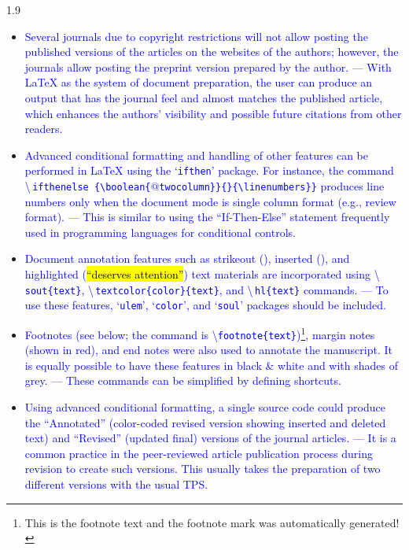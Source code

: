 \documentclass[phd]{ndsu-thesis-2022}
\newcommand\myspacing{1.9} %
\newcommand\italk[1]{\textcolor{blue}{#1}}  %
\newcommand\cmd[1]{\textbackslash\texttt{#1}}  %
\newcommand\lx{\LaTeX\xspace}
\newcommand\vb[1]{\textcolor{blue}{\texttt{#1}}}%
\newcommand\vbc[1]{\textcolor{blue}{\textbackslash\,\texttt{#1}}}%
\begin{document}
\begin{spacing}{\myspacing}
\begin{itemize}[leftmargin=*, itemsep=0pt, parsep=3pt]
\item \italk{Several journals due to copyright restrictions will not allow posting the published versions of the articles on the websites of the authors; however, the journals allow posting the preprint version prepared by the author. --- With \lx as the system of document preparation, the user can produce an output that has the journal feel and almost matches the published article, which enhances the authors' visibility and possible future citations from other readers.}  

\item \italk{Advanced conditional formatting and handling of other features can be performed in \lx using the `\vb{ifthen}' package. For instance, the command} \vbc{ifthenelse
\{\textbackslash boolean\{$@$twocolumn\}\}\{\}\{\textbackslash linenumbers\}\}} \italk{produces line numbers only when the document mode is single column format (e.g., review format). --- This is similar to using the ``If-Then-Else'' statement frequently used in programming languages for conditional controls.}   

\item \italk{Document annotation features such as strikeout (\dt{``deleted text''}), inserted (\nt{``newly added''}), and highlighted (\hl{``deserves attention''}) text materials are incorporated using \vbc{sout\{text\}}, \vbc{textcolor\{color\}\{text\}}, and \vbc{hl\{text\}} commands. --- To use these features, `\vb{ulem}', `\vb{color}', and `\vb{soul}' packages should be included.} 

\item \italk{Footnotes (see below; the command is \cmd{footnote\{text\}})\footnote{This is the footnote text and the footnote mark was automatically generated!}, margin notes {\marginpar{\scriptsize\textcolor{red}{This is margin note shown in color.}}} (shown in red), and end notes were also used to annotate the manuscript. It is equally possible to have these features in black \& white and with shades of grey. --- These commands can be simplified by defining shortcuts.} 

\item \italk{Using advanced conditional formatting, a single source code could produce the ``Annotated'' (color-coded revised version showing inserted and deleted text) and ``Revised'' (updated final) versions of the journal articles. --- It is a common practice in the peer-reviewed article publication process during revision to create such versions. This usually takes the preparation of two different versions with the usual TPS.}  


\end{itemize}
\end{spacing}
\end{document}
